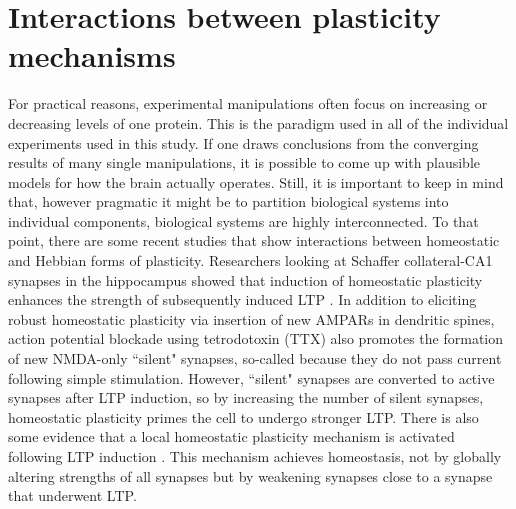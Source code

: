 \section{Interactions between plasticity mechanisms}
For practical reasons, experimental manipulations often focus on increasing or decreasing levels of one protein. This is the paradigm used in all of the individual experiments used in this study. If one draws conclusions from the converging results of many single manipulations, it is possible to come up with plausible models for how the brain actually operates. Still, it is important to keep in mind that, however pragmatic it might be to partition biological systems into individual components, biological systems are highly interconnected. To that point, there are some recent studies that show interactions between homeostatic and Hebbian forms of plasticity. Researchers looking at Schaffer collateral-CA1 synapses in the hippocampus showed that induction of homeostatic plasticity enhances the strength of subsequently induced LTP \cite{Arendt2013}. In addition to eliciting robust homeostatic plasticity via insertion of new AMPARs in dendritic spines, action potential blockade using tetrodotoxin (TTX) also promotes the formation of new NMDA-only ``silent" synapses, so-called because they do not pass current following simple stimulation. However, ``silent" synapses are converted to active synapses after LTP induction, so by increasing the number of silent synapses, homeostatic plasticity primes the cell to undergo stronger LTP. There is also some evidence that a local homeostatic plasticity mechanism is activated following LTP induction \cite{Rabinowitch2008}. This mechanism achieves homeostasis, not by globally altering strengths of all synapses but by weakening synapses close to a synapse that underwent LTP.

